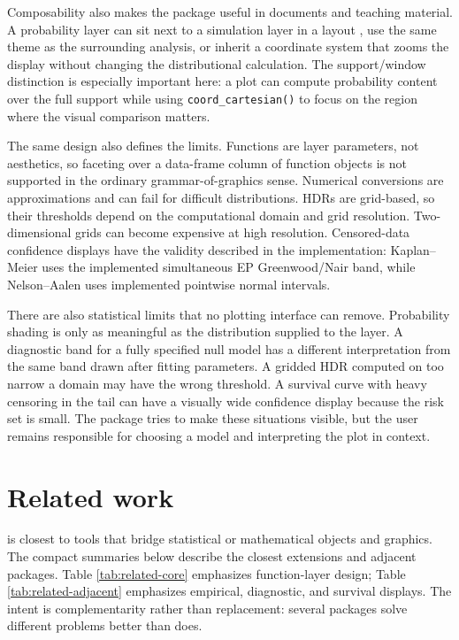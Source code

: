 Composability also makes the package useful in documents and teaching material.
A probability layer can sit next to a simulation layer in a 
layout \citep{patchwork}, use the same theme as the surrounding analysis, or inherit
a coordinate system that zooms the display without changing the distributional
calculation.
The support/window distinction is especially important here: a plot can compute
probability content over the full support while using \texttt{coord\_cartesian()} to
focus on the region where the visual comparison matters.

The same design also defines the limits. Functions are layer parameters, not
aesthetics, so faceting over a data-frame column of function objects is not
supported in the ordinary grammar-of-graphics sense. Numerical conversions are
approximations and can fail for difficult distributions. HDRs are grid-based,
so their thresholds depend on the computational domain and grid resolution.
Two-dimensional grids can become expensive at high resolution. Censored-data
confidence displays have the validity described in the implementation:
Kaplan--Meier uses the implemented simultaneous EP Greenwood/Nair band, while
Nelson--Aalen uses implemented pointwise normal intervals.

There are also statistical limits that no plotting interface can remove.
Probability shading is only as meaningful as the distribution supplied to the
layer. A diagnostic band for a fully specified null model has a different
interpretation from the same band drawn after fitting parameters. A gridded HDR
computed on too narrow a domain may have the wrong threshold. A survival curve
with heavy censoring in the tail can have a visually wide confidence display
because the risk set is small. The package tries to make these situations
visible, but the user remains responsible for choosing a model and interpreting
the plot in context.

\section{Related work}\label{related-work}

 is closest to tools that bridge statistical or mathematical
objects and graphics. The compact summaries below describe the closest
 extensions and adjacent packages. Table
\ref{tab:related-core} emphasizes function-layer design; Table
\ref{tab:related-adjacent} emphasizes empirical, diagnostic, and
survival displays. The intent is complementarity rather than replacement:
several packages solve different problems better than  does.

